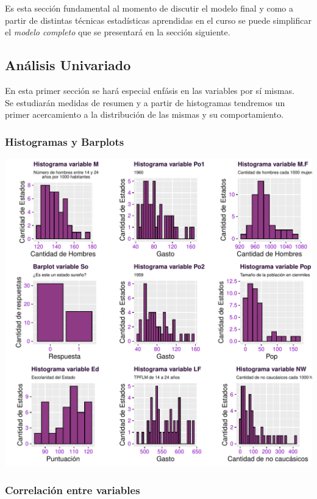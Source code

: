 \documentclass[11pt,a4paper]{article}\usepackage[]{graphicx}\usepackage[]{color}
\makeatletter
\def\maxwidth{ %
  \ifdim\Gin@nat@width>\linewidth
    \linewidth
  \else
    \Gin@nat@width
  \fi
}
\newenvironment{knitrout}{}{} %
\makeatother
\begin{document}
Es esta sección fundamental al momento de discutir el modelo final y como a partir de distintas técnicas estadísticas aprendidas en el curso se puede simplificar el \textit{modelo completo} que se presentará en la sección siguiente.

\subsection{Análisis Univariado}
En esta primer sección se hará especial enfásis en las variables por sí mismas.
\\

Se estudiarán medidas de resumen y a partir de histogramas tendremos un primer acercamiento a la distribución de las mismas y su comportamiento.

\newpage
\subsubsection{Histogramas y Barplots}
\begin{knitrout}
\color{fgcolor}
\includegraphics[width=\maxwidth]{figure/unnamed-chunk-2-1} 

\end{knitrout}
\newpage

\subsubsection{Correlación entre variables}
\end{document}
